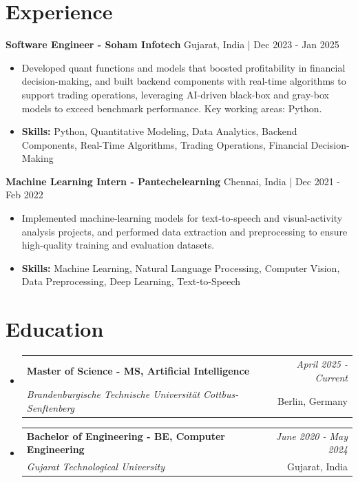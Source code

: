 \documentclass[a4paper,11pt]{article}
\makeatletter
\newcommand{\resumeSubheading}[4]{
\vspace{0.5mm}\item
    \begin{tabular*}{\linewidth}[t]{l@{\extracolsep{\fill}}r}
        \textbf{#1} & \textit{\footnotesize{#4}} \\
        \textit{\footnotesize{#3}} &  \footnotesize{#2}\\
    \end{tabular*}
    \vspace{-2.4mm}
}
\makeatother
\begin{document}
\section{\textbf{Experience}}


\vspace{1mm}
  \textbf{Software Engineer - Soham Infotech} \hfill Gujarat, India | Dec 2023 - Jan 2025
\vspace{-1.5mm} %
\begin{itemize}
  \item Developed quant functions and models that boosted profitability in financial decision-making, and built backend components with real-time algorithms to support trading operations, leveraging AI-driven black-box and gray-box models to exceed benchmark performance. Key working areas: Python.

\vspace{-2mm}
  \item \textbf{Skills:} Python, Quantitative Modeling, Data Analytics, Backend Components, Real-Time Algorithms, Trading Operations, Financial Decision-Making
\end{itemize}

\vspace{1mm}
  \textbf{Machine Learning Intern - Pantechelearning} \hfill Chennai, India | Dec 2021 - Feb 2022
\vspace{-1.5mm} %
\begin{itemize}
  \item Implemented machine-learning models for text-to-speech and visual-activity analysis projects, and performed data extraction and preprocessing to ensure high-quality training and evaluation datasets.
\vspace{-2mm}
  \item \textbf{Skills:} Machine Learning, Natural Language Processing, Computer Vision, Data Preprocessing, Deep Learning, Text-to-Speech
\end{itemize}\section{\textbf{Education}}
\vspace{-0.4mm}

\begin{itemize}[leftmargin=0.15in, label={}]
\resumeSubheading
{Master of Science - MS, Artificial Intelligence }{Berlin, Germany}
{Brandenburgische Technische Universität Cottbus-Senftenberg  }{April 2025 - Current}

\vspace{1.0mm} %
\resumeSubheading
{Bachelor of Engineering - BE, Computer Engineering  }{Gujarat, India}
{Gujarat Technological University }{June 2020 - May 2024}

\end{itemize}
\end{document}
